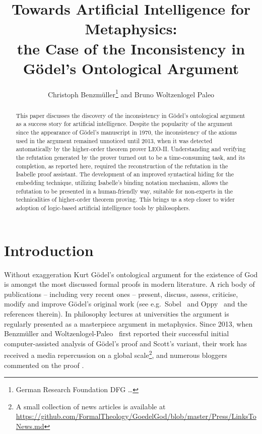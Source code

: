 \documentclass{article}
\title{Towards Artificial Intelligence for Metaphysics: \\ the Case of the Inconsistency in G\"odel's Ontological Argument}
\author{Christoph Benzm\"uller\thanks{German Research Foundation DFG \ldots} and Bruno Woltzenlogel Paleo}
\author{}
\begin{document}
\maketitle

\begin{abstract}
  This paper discusses the discovery of the inconsistency in G\"odel's ontological argument as a success story for artificial intelligence. Despite the popularity of the argument since the appearance of G\"odel's manuscript in 1970, the inconsistency of the axioms used in the argument remained unnoticed until 2013, when it was detected automatically by the higher-order theorem prover LEO-II. Understanding and verifying the refutation generated by the prover turned out to be a time-consuming task, and its completion, as reported here, required the reconstruction of the refutation in the Isabelle proof assistant. The development of an improved syntactical hiding for the embedding technique, utilizing Isabelle's binding notation mechanism, allows the refutation to be presented in a human-friendly way, suitable for non-experts in the technicalities of higher-order theorem proving. This brings us a step closer to wider adoption of logic-based artificial intelligence tools by philosophers.
\end{abstract}


\section{Introduction}
Without exaggeration Kurt G\"{o}del's ontological
argument for the existence of God \cite{GoedelNotes,ScottNotes} is
amongst the most discussed formal proofs in modern literature. A rich
body of publications -- including very recent ones -- present,
discuss, assess, criticise, modify and improve G\"{o}del's original
work (see e.g.~Sobel~ and Oppy~ and the
references therein).  In philosophy lectures at universities the
argument is regularly presented as a masterpiece argument in
metaphysics. Since 2013, when Benzm\"uller and Woltzenlogel-Paleo~ first
reported their successful initial computer-assisted
analysis of G\"odel's proof and Scott's variant,
their work has received a media repercussion on a global scale\footnote{A
  small collection of news articles is available at {\scriptsize
    \url{https://github.com/FormalTheology/GoedelGod/blob/master/Press/LinksToNews.md}}},
and numerous bloggers commented on the proof
\cite{fuhrmann15:_blogg_goedel}.
\end{document}
